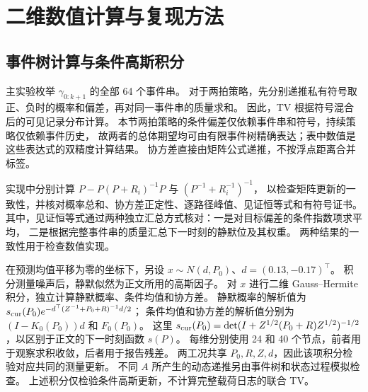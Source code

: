 \section{二维数值计算与复现方法}
\label{app:validation}
\subsection{事件树计算与条件高斯积分}
主实验枚举 $\gamma_{0:k+1}$ 的全部 64 个事件串。
对于两拍策略，先分别递推私有符号取正、负时的概率和偏差，再对同一事件串的质量求和。
因此，TV 根据符号混合后的可见记录分布计算。
本节两拍策略的条件偏差仅依赖事件串和符号，持续策略仅依赖事件历史，
故两者的总体期望均可由有限事件树精确表达；表中数值是这些表达式的双精度计算结果。
协方差直接由矩阵公式递推，不按浮点距离合并标签。

实现中分别计算 $P-P(P+R_i)^{-1}P$ 与 $(P^{-1}+R_i^{-1})^{-1}$，
以检查矩阵更新的一致性，并核对概率总和、协方差正定性、逐路径峰值、见证恒等式和有符号证书。
其中，见证恒等式通过两种独立汇总方式核对：一是对目标偏差的条件指数项求平均，
二是根据完整事件串的质量汇总下一时刻的静默位及其权重。
两种结果的一致性用于检查数值实现。

在预测均值平移为零的坐标下，另设 $x\sim N(d,P_0)$、$d=(0.13,-0.17)^\top$。
积分测量噪声后，静默似然为正文所用的高斯因子。
对 $x$ 进行二维 Gauss--Hermite 积分，独立计算静默概率、条件均值和协方差。
静默概率的解析值为 $s_{\rm cur}(P_0)\allowbreak e^{-d^\top(Z^{-1}+P_0+R)^{-1}d/2}$；
条件均值和协方差的解析值分别为 $(I-K_0(P_0))d$ 和 $F_0(P_0)$。
这里 $s_{\rm cur}(P_0)=\det(I+Z^{1/2}(P_0+R)Z^{1/2})^{-1/2}$，以区别于正文的下一时刻函数 $s(P)$。
每维分别使用 24 和 40 个节点，前者用于观察求积收敛，后者用于报告残差。
两工况共享 $P_0,R,Z,d$，因此该项积分检验对应共同的测量更新。
不同 $A$ 所产生的动态递推另由事件树和状态过程模拟检查。
上述积分仅检验条件高斯更新，不计算完整载荷日志的联合 TV。

